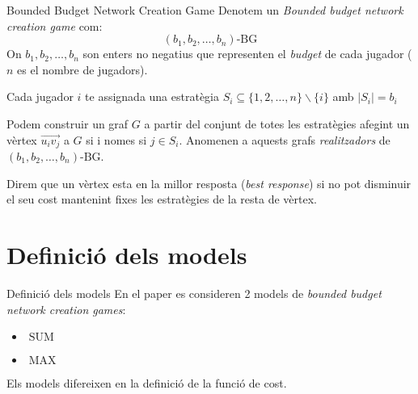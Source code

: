 \documentclass[aspectratio=169]{beamer}
\DeclareMathOperator{\SUM}{SUM}
\DeclareMathOperator{\MAX}{MAX}
\begin{document}
\begin{frame}{Bounded Budget Network Creation Game}
    Denotem un \emph{Bounded budget network creation game} com:
    $$ (b_1, b_2, \dots , b_n)\text{-BG} $$
    On $b_1,b_2, \dots , b_n$ son enters no negatius que representen el \emph{budget} de cada jugador ($n$ es el nombre de jugadors).
    
    \vspace{3mm}
    
    Cada jugador $i$ te assignada una estratègia $S_i \subseteq \{1, 2, \dots , n\} \backslash \{i\}$ amb
    $|S_i| = b_i$
    
    \vspace{3mm}
    
    Podem construir un graf $G$ a partir del conjunt de totes les estratègies afegint un vèrtex $\vec{u_iv_j}$
    a $G$ si i nomes si $j \in S_i$. Anomenen a aquests grafs \emph{realitzadors} de
    $ (b_1, b_2, \dots , b_n)\text{-BG} $.
    
    \vspace{3mm}
    
    Direm que un vèrtex esta en la millor resposta (\emph{best response}) si no pot disminuir el seu
    cost mantenint fixes les estratègies de la resta de vèrtex.
\end{frame}


\section{Definició dels models}

\begin{frame}{Definició dels models}
    En el paper\cite{ehsani_bounded_2015} es consideren 2 models de \emph{bounded budget network creation games}:
    
    \begin{itemize}
    \item $\SUM$
    \item $\MAX$
    \end{itemize}
    
    \vspace{3em}
    
    Els models difereixen en la definició de la funció de cost.
\end{frame}
\end{document}
